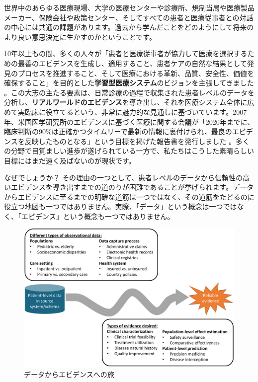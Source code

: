 \documentclass[
  11pt]{book}
\theoremstyle{definition}
\theoremstyle{definition}
\theoremstyle{definition}
\theoremstyle{definition}
\theoremstyle{remark}
\begin{document}
世界中のあらゆる医療現場、大学の医療センターや診療所、規制当局や医療製品メーカー、保険会社や政策センター、そしてすべての患者と医療従事者との対話の中心には共通の課題があります。過去から学んだことをどのようにして将来のより良い意思決定に生かすのかということです。

10年以上もの間、多くの人々が「患者と医療従事者が協力して医療を選択するための最善のエビデンスを生成し、適用すること、患者ケアの自然な結果として発見のプロセスを推進すること、そして医療における革新、品質、安全性、価値を確保すること」を目的とした\textbf{学習型医療システム}のビジョンを主張してきました \citep{olsen2007learning} 。この大志の主たる要素は、日常診療の過程で収集された患者レベルのデータを分析し、\textbf{リアルワールドのエビデンス}を導き出し、それを医療システム全体に広めて実臨床に役立てるという、非常に魅力的な見通しに基づいています。2007年、米国医学研究所のエビデンスに基づく医療に関する会議が「2020年までに、臨床判断の90\%は正確かつタイムリーで最新の情報に裏付けられ、最良のエビデンスを反映したものとなる」という目標を掲げた報告書を発行しました \citep{olsen2007learning}。多くの分野で目覚ましい進歩が遂げられている一方で、私たちはこうした素晴らしい目標にはまだ遠く及ばないのが現状です。

なぜでしょうか？ その理由の一つとして、患者レベルのデータから信頼性の高いエビデンスを導き出すまでの道のりが困難であることが挙げられます。データからエビデンスに至るまでの明確な道筋は一つではなく、その道筋をたどるのに役立つ地図も一つではありません。実際、「データ」という概念は一つではなく、「エビデンス」という概念も一つではありません。

\begin{figure}

{\centering \includegraphics[width=1\linewidth]{images/OhdsiCommunity/datajourney} 

}

\caption{データからエビデンスへの旅}\label{fig:datajourney}
\end{figure}
\end{document}
